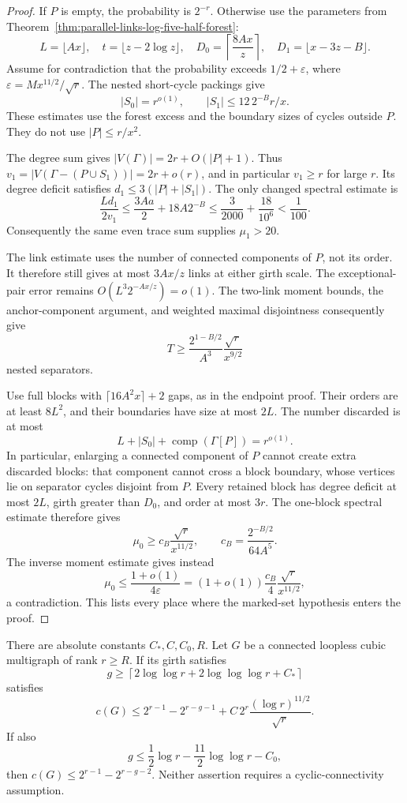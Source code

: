 \begin{proof}
If $P$ is empty, the probability is $2^{-r}$.
Otherwise use the parameters from Theorem~\ref{thm:parallel-links-log-five-half-forest}:
\[
 L=\lfloor Ax\rfloor,\quad
 t=\lfloor z-2\log z\rfloor,\quad
 D_0=\left\lceil\frac{8Ax}{z}\right\rceil,\quad
 D_1=\lfloor x-3z-B\rfloor.
\]
Assume for contradiction that the probability exceeds
$1/2+\varepsilon$, where $\varepsilon=Mx^{11/2}/\sqrt r$.
The nested short-cycle packings give
\[
 |S_0|=r^{o(1)},\qquad
 |S_1|\le12\,2^{-B}r/x.
\]
These estimates use the forest excess and the boundary sizes of cycles outside $P$.
They do not use $|P|\le r/x^2$.

The degree sum gives $|V(\Gamma)|=2r+O(|P|+1)$.
Thus $v_1=|V(\Gamma-(P\cup S_1))|=2r+o(r)$, and in particular $v_1\ge r$ for large $r$.
Its degree deficit satisfies $d_1\le3(|P|+|S_1|)$.
The only changed spectral estimate is
\[
 \frac{Ld_1}{2v_1}
 \le\frac{3Aa}{2}+18A2^{-B}
 \le\frac3{2000}+\frac{18}{10^6}
 <\frac1{100}.
\]
Consequently the same even trace sum supplies $\mu_1>20$.

The link estimate uses the number of connected components of $P$, not its order.
It therefore still gives at most $3Ax/z$ links at either girth scale.
The exceptional-pair error remains $O(L^3 2^{-Ax/z})=o(1)$.
The two-link moment bounds, the anchor-component argument, and weighted maximal disjointness consequently give
\[
 T\ge\frac{2^{1-B/2}}{A^3}\frac{\sqrt r}{x^{9/2}}
\]
nested separators.

Use full blocks with $\lceil16A^2x\rceil+2$ gaps, as in the endpoint proof.
Their orders are at least $8L^2$, and their boundaries have size at most $2L$.
The number discarded is at most
\[
 L+|S_0|+\operatorname{comp}(\Gamma[P])=r^{o(1)}.
\]
In particular, enlarging a connected component of $P$ cannot create extra discarded blocks:
that component cannot cross a block boundary, whose vertices lie on separator cycles disjoint from $P$.
Every retained block has degree deficit at most $2L$, girth greater than $D_0$, and order at most $3r$.
The one-block spectral estimate therefore gives
\[
 \mu_0\ge c_B\frac{\sqrt r}{x^{11/2}},
 \qquad c_B=\frac{2^{-B/2}}{64A^5}.
\]
The inverse moment estimate gives instead
\[
 \mu_0\le\frac{1+o(1)}{4\varepsilon}
 =(1+o(1))\frac{c_B}{4}\frac{\sqrt r}{x^{11/2}},
\]
a contradiction.
This lists every place where the marked-set hypothesis enters the proof.
\end{proof}

\begin{corollary}
\label{cor:random-improved-girth-window}
There are absolute constants $C_*,C,C_0,R$.
Let $G$ be a connected loopless cubic multigraph of rank $r\ge R$.
If its girth satisfies
\[
 g\ge
 \left\lceil
 2\log\log r+2\log\log\log r+C_*
 \right\rceil
\]
satisfies
\[
 c(G)\le
 2^{r-1}-2^{r-g-1}
 +C\,2^r\frac{(\log r)^{11/2}}{\sqrt r}.
\]
If also
\[
 g\le\frac12\log r-\frac{11}{2}\log\log r-C_0,
\]
then $c(G)\le2^{r-1}-2^{r-g-2}$.
Neither assertion requires a cyclic-connectivity assumption.
\end{corollary}

